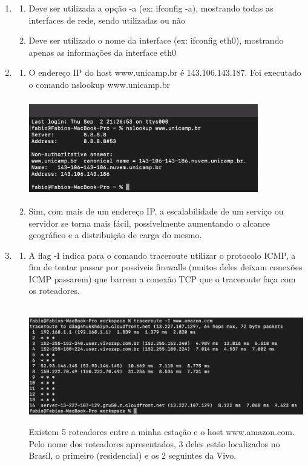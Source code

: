 \documentclass[12pt,a4paper]{report}
\begin{document}
\begin{enumerate}
    \item
    \begin{enumerate}
        \item Deve ser utilizada a opção -a (ex: ifconfig -a), mostrando todas as interfaces de rede, sendo utilizadas ou não
        \item Deve ser utilizado o nome da interface (ex: ifconfig eth0), mostrando apenas as informações da interface eth0
    \end{enumerate}
    
    \item
    \begin{enumerate}
        \item O endereço IP do host www.unicamp.br é 143.106.143.187. Foi executado o comando nslookup www.unicamp.br
        \\
        \\
        \includegraphics[width=10cm, height=4cm]{2a.png}
        \item Sim, com mais de um endereço IP, a escalabilidade de um serviço ou servidor se torna mais fácil, possivelmente aumentando o alcance geográfico e a distribuição de carga do mesmo.
    \end{enumerate}
    
    \item
    \begin{enumerate}
        \item A flag -I indica para o comando traceroute utilizar o protocolo ICMP, a fim de tentar passar por possíveis firewalls (muitos deles deixam conexões ICMP passarem) que barrem a conexão TCP que o traceroute faça com os roteadores.
        \\
        \\
        \includegraphics[width=12cm, height=5cm]{3a.png}
        \\
    	Existem 5 roteadores entre a minha estação e o host www.amazon.com. Pelo nome dos roteadores apresentados, 3 deles estão localizados no Brasil, o primeiro (residencial) e os 2 seguintes da Vivo.
    \end{enumerate}
    

\end{enumerate}
\end{document}
